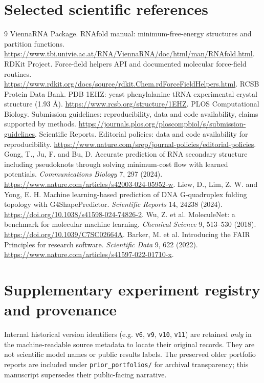 \documentclass[10pt,a4paper]{article}
\begin{document}
\section{Selected scientific references}
\begin{thebibliography}{9}
 ViennaRNA Package. RNAfold manual: minimum-free-energy structures and partition functions. \url{https://www.tbi.univie.ac.at/RNA/ViennaRNA/doc/html/man/RNAfold.html}.
 RDKit Project. Force-field helpers API and documented molecular force-field routines. \url{https://www.rdkit.org/docs/source/rdkit.Chem.rdForceFieldHelpers.html}.
 RCSB Protein Data Bank. PDB 1EHZ: yeast phenylalanine tRNA experimental crystal structure (1.93 \AA). \url{https://www.rcsb.org/structure/1EHZ}.
 PLOS Computational Biology. Submission guidelines: reproducibility, data and code availability, claims supported by methods. \url{https://journals.plos.org/ploscompbiol/s/submission-guidelines}.
 Scientific Reports. Editorial policies: data and code availability for reproducibility. \url{https://www.nature.com/srep/journal-policies/editorial-policies}.
 Gong, T., Ju, F. and Bu, D. Accurate prediction of RNA secondary structure including pseudoknots through solving minimum-cost flow with learned potentials. \emph{Communications Biology} 7, 297 (2024). \url{https://www.nature.com/articles/s42003-024-05952-w}.
 Liew, D., Lim, Z. W. and Yong, E. H. Machine learning-based prediction of DNA G-quadruplex folding topology with G4ShapePredictor. \emph{Scientific Reports} 14, 24238 (2024). \url{https://doi.org/10.1038/s41598-024-74826-2}.
 Wu, Z. et al. MoleculeNet: a benchmark for molecular machine learning. \emph{Chemical Science} 9, 513--530 (2018). \url{https://doi.org/10.1039/C7SC02664A}.
 Barker, M. et al. Introducing the FAIR Principles for research software. \emph{Scientific Data} 9, 622 (2022). \url{https://www.nature.com/articles/s41597-022-01710-x}.

\end{thebibliography}
\clearpage\appendix
\section{Supplementary experiment registry and provenance}
Internal historical version identifiers (e.g. \texttt{v6}, \texttt{v9}, \texttt{v10}, \texttt{v11}) are retained \emph{only} in the machine-readable source metadata to locate their original records. They are not scientific model names or public results labels. The preserved older portfolio reports are included under \texttt{prior\_portfolios/} for archival transparency; this manuscript supersedes their public-facing narrative.
\end{document}
